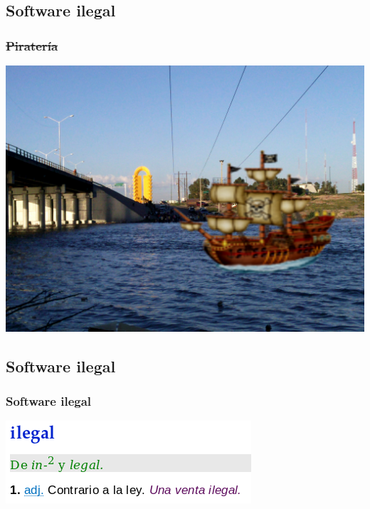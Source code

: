 \subsection{Software ilegal}
\begin{frame}
    \frametitle{\sout{Piratería}}
    \includegraphics[width=\textwidth]{Pirateria.png}
\end{frame}

\subsection{Software ilegal}
\begin{frame}
    \frametitle{Software ilegal}
        \begin{center}
            \includegraphics[width=\textwidth]{ilegal.png}
        \end{center}
\end{frame}

